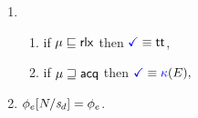\begin{minipage}{1.0\linewidth}
\begin{multicols}{2}
\begin{enumerate}[topsep=0pt,label=(\textsc{r}\arabic*),ref=\textsc{r}\arabic*]
    \item[] 
      \begin{enumerate}[leftmargin=0pt]
      \item \label{read-term-nonempty-ca}
        if $\mu\sqsubseteq{\mathsf{rlx}}$ then $\aTerm \riff \TRUE$,
      \item \label{read-term-empty-ca}
        if $\mu\sqsupseteq{\mathsf{acq}}$ then
        \begin{math}
          \aTerm \riff
          \kappaE{}, %
        \end{math}
      \end{enumerate}      
    \item \label{read-phi-ca}
      $\phi_e[N/\mathit{s}_{d}]=\phi_e$.
    \end{enumerate}

\end{multicols}
\end{minipage}
